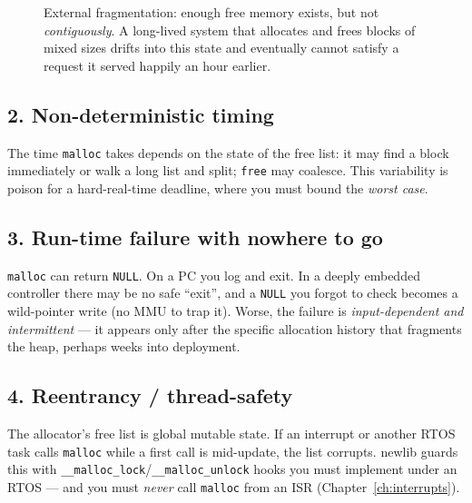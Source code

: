 \documentclass[11pt,a4paper,oneside]{book}
\newcommand{\code}[1]{\texttt{#1}}
\begin{document}
\begin{figure}[h]
\centering
{}
\caption{External fragmentation: enough free memory exists, but not
\emph{contiguously}. A long-lived system that allocates and frees blocks of
mixed sizes drifts into this state and eventually cannot satisfy a request it
served happily an hour earlier.}
\label{fig:frag}
\end{figure}

\subsection{2. Non-deterministic timing}
The time \code{malloc} takes depends on the state of the free list: it may find
a block immediately or walk a long list and split; \code{free} may coalesce.
This variability is poison for a hard-real-time deadline, where you must bound
the \emph{worst case}.

\subsection{3. Run-time failure with nowhere to go}
\code{malloc} can return \code{NULL}. On a PC you log and exit. In a deeply
embedded controller there may be no safe ``exit'', and a \code{NULL} you forgot
to check becomes a wild-pointer write (no MMU to trap it). Worse, the failure is
\emph{input-dependent and intermittent} --- it appears only after the specific
allocation history that fragments the heap, perhaps weeks into deployment.

\subsection{4. Reentrancy / thread-safety}
The allocator's free list is global mutable state. If an interrupt or another
RTOS task calls \code{malloc} while a first call is mid-update, the list
corrupts. newlib guards this with \code{\_\_malloc\_lock}/\code{\_\_malloc\_unlock}
hooks you must implement under an RTOS --- and you must \emph{never} call
\code{malloc} from an ISR (Chapter~\ref{ch:interrupts}).
\end{document}
